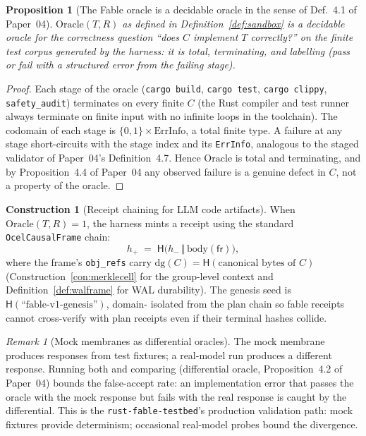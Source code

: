 \documentclass[11pt,a4paper]{article}
\newtheorem{proposition}[theorem]{Proposition}
\theoremstyle{definition}
\newtheorem{construction}[theorem]{Construction}
\theoremstyle{remark}
\newtheorem{remark}[theorem]{Remark}
\newcommand{\chainH}{\mathsf{H}}
\newcommand{\fr}{\mathsf{fr}}             %
\newcommand{\dg}{\mathrm{dg}}             %
\newcommand{\code}[1]{\texttt{#1}}        %
\begin{document}
\begin{proposition}[The Fable oracle is a decidable oracle in the sense of Def.~4.1 of
Paper~04]\label{prop:fable-oracle}
$\mathrm{Oracle}(T,R)$ as defined in Definition~\ref{def:sandbox} is a decidable oracle
for the correctness question ``does $C$ implement $T$ correctly?'' on the finite test
corpus generated by the harness: it is total, terminating, and labelling (pass or fail
with a structured error from the failing stage).
\end{proposition}

\begin{proof}
Each stage of the oracle (\code{cargo build}, \code{cargo test}, \code{cargo clippy},
\code{safety\_audit}) terminates on every finite $C$ (the Rust compiler and test runner
always terminate on finite input with no infinite loops in the toolchain). The codomain
of each stage is $\{0,1\}\times\mathrm{ErrInfo}$, a total finite type. A failure at any
stage short-circuits with the stage index and its \code{ErrInfo}, analogous to the
staged validator of Paper~04's Definition~4.7. Hence $\mathrm{Oracle}$ is total and
terminating, and by Proposition~4.4 of Paper~04 any observed failure is a genuine
defect in $C$, not a property of the oracle.
\end{proof}

\begin{construction}[Receipt chaining for LLM code artifacts]\label{con:fablechain}
When $\mathrm{Oracle}(T,R)=1$, the harness mints a receipt using the standard
\code{OcelCausalFrame} chain:
\begin{equation}\label{eq:fablechain}
h_{+}\;=\;\chainH\bigl(h_{-}\,\Vert\,\mathrm{body}(\fr)\bigr),
\end{equation}
where the frame's \code{obj\_refs} carry $\dg(C)=\chainH(\text{canonical bytes of }C)$
(Construction~\ref{con:merklecell} for the group-level context and Definition~\ref{def:walframe}
for WAL durability). The genesis seed is $\chainH(\text{``fable-v1-genesis''})$, domain-
isolated from the plan chain so fable receipts cannot cross-verify with plan receipts even
if their terminal hashes collide.
\end{construction}

\begin{remark}[Mock membranes as differential oracles]
The mock membrane produces responses from test fixtures; a real-model run produces a
different response. Running both and comparing (differential oracle,
Proposition~4.2 of Paper~04) bounds the false-accept rate: an implementation error that
passes the oracle with the mock response but fails with the real response is caught by the
differential. This is the \code{rust-fable-testbed}'s production validation path: mock
fixtures provide determinism; occasional real-model probes bound the divergence.
\end{remark}
\end{document}
